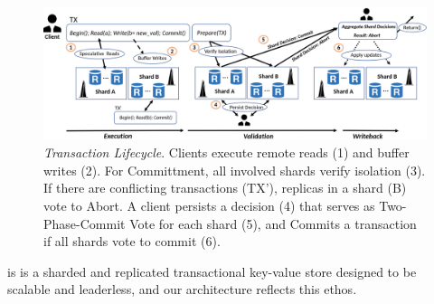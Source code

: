 
\begin{figure}[!th]
\begin{center}
\includegraphics[width= \textwidth]{./figures/Archi.png}
\end{center}
\caption{{\em Transaction Lifecycle}. Clients execute remote reads (1) and buffer writes (2). For Committment, all involved shards verify isolation (3). If there are conflicting transactions (TX'), replicas in a shard (B) vote to Abort. A client persists a decision (4) that serves as Two-Phase-Commit Vote for each shard (5), and Commits a transaction if all shards vote to commit (6).}
\label{fig:Figure1}
\end{figure}
 

\sys is is a sharded and replicated transactional key-value store designed to be scalable and leaderless, and our architecture reflects this ethos. 

